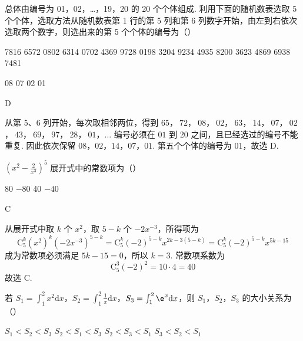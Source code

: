 \begin{problem}
总体由编号为 01，02，…，19，20 的 20 个个体组成. 利用下面的随机数表选取 5 个个体，选取方法从随机数表第 1 行的第 5 列和第 6 列数字开始，由左到右依次选取两个数字，则选出来的第 5 个个体的编号为（\quad）

7816 6572 0802 6314 0702 4369 9728 0198 3204 9234 4935 8200 3623 4869 6938 7481

\choices
    {08}
    {07}
    {02}
    {01}
\end{problem}

\begin{answer}
D
\end{answer}

\begin{solution}
从第 5、6 列开始，每次取相邻两位，得到
\(65\)，\(\ 72\)，\(\ 08\)，\(\ 02\)，\(\ 63\)，\(\ 14\)，\(\ 07\)，\(\ 02\)，\(\ 43\)，\(\ 69\)，\(\ 97\)，\(\ 28\)，\(\ 01\)，\(\ldots\)
编号必须在 \(01\) 到 \(20\) 之间，且已经选过的编号不能重复. 因此依次保留
\(08\)，\(02\)，\(14\)，\(07\)，\(01\).
第五个个体的编号为 \(01\)，故选 D.
\end{solution}

\begin{problem}
\(\left(x^{2} - \frac{2}{x^{3}}\right)^{5}\) 展开式中的常数项为（\quad）

\choices
    {80}
    {\(-80\)}
    {40}
    {\(-40\)}
\end{problem}

\begin{answer}
C
\end{answer}

\begin{solution}
从展开式中取 \(k\) 个 \(x^2\)，取 \(5-k\) 个 \(-2x^{-3}\)，所得项为
\[
\mathrm C_5^k(x^2)^k\left(-2x^{-3}\right)^{5-k}
=\mathrm C_5^k(-2)^{5-k}x^{2k-3(5-k)}
=\mathrm C_5^k(-2)^{5-k}x^{5k-15}
\]
成为常数项必须满足 \(5k-15=0\)，所以 \(k=3\). 常数项系数为
\[
\mathrm C_5^3(-2)^2=10\cdot4=40
\]
故选 C.
\end{solution}

\begin{problem}
若 \(S_{1} = \int_{1}^{2} x^{2} \mathrm{d}x\)，\(S_{2} = \int_{1}^{2} \frac{1}{x} \mathrm{d}x\)，\(S_{3} = \int_{1}^{2} \e^{x} \mathrm{d}x\)，则 \(S_{1}\)，\(S_{2}\)，\(S_{3}\) 的大小关系为（\quad）

\choices
    {\(S_{1} < S_{2} < S_{3}\)}
    {\(S_{2} < S_{1} < S_{3}\)}
    {\(S_{2} < S_{3} < S_{1}\)}
    {\(S_{3} < S_{2} < S_{1}\)}
\end{problem}

